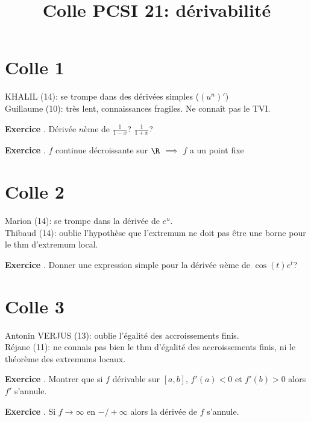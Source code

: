 \documentclass[10pt,a4paper]{article}
\title{Colle PCSI 21: dérivabilité}
\newcounter{question}
\newcounter{exo}
\newenvironment{exo}{\vspace{0.5cm}\setcounter{question}{0}\addtocounter{exo}{1} \noindent \textbf{Exercice \theexo}. \normalsize }{\par}
\begin{document}
	\maketitle
\section*{Colle 1}
\setcounter{exo}{0}
	KHALIL (14): se trompe dans des dérivées simples ($(u^n)'$)\\
	Guillaume (10): très lent, connaissances fragiles. Ne connaît pas le TVI.\\
	
	\begin{exo}
		Dérivée $n$ème de $\frac{1}{1 - x}$? $\frac{1}{1 + x}$?
 	\end{exo}

	\begin{exo}
		$f$ continue décroissante sur $\R$ $\implies$ $f$ a un point fixe
	\end{exo}
	
	\section*{Colle 2}
	Marion (14): se trompe dans la dérivée de $e^u$.\\
	Thibaud (14): oublie l'hypothèse que l'extremum ne doit pas être une borne pour le thm d'extremum local.

	\begin{exo}
		Donner une expression simple pour la dérivée $n$ème de $\cos(t) e^t$?
	\end{exo}

	\section*{Colle 3}
	\setcounter{exo}{0}
	Antonin VERJUS (13): oublie l'égalité des accroissements finis.\\
	Réjane (11): ne connais pas bien le thm d'égalité des accroissements finis, ni le théorème des extremums locaux.\\
	
	\begin{exo}
		Montrer que si $f$ dérivable sur $[a, b]$, $f'(a) < 0$ et $f'(b) > 0$ alors $f'$ s'annule.
	\end{exo}
		
	\begin{exo}
		Si $f \longrightarrow \infty$ en $-/+ \infty$ alors la dérivée de $f$ s'annule.
	\end{exo}
	
\end{document}
